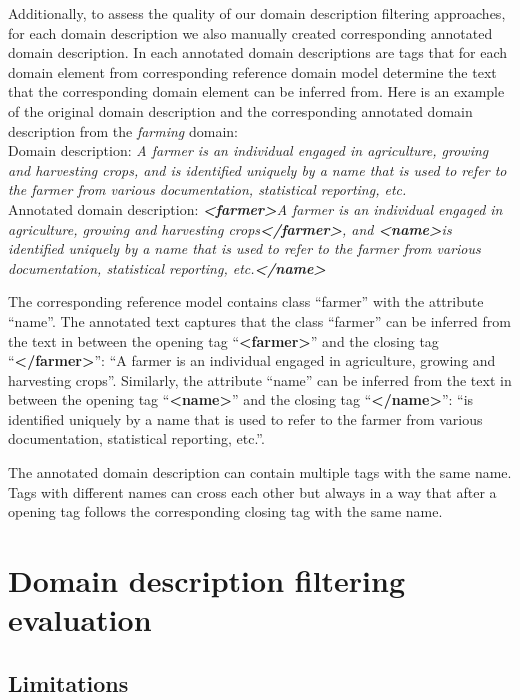 Additionally, to assess the quality of our domain description filtering approaches, for each domain description we also manually created corresponding annotated domain description. In each annotated domain descriptions are tags that for each domain element from corresponding reference domain model determine the text that the corresponding domain element can be inferred from. Here is an example of the original domain description and the corresponding annotated domain description from the \emph{farming} domain: \\

\noindent{}Domain description: \textit{A farmer is an individual engaged in agriculture, growing and harvesting crops, and is identified uniquely by a name that is used to refer to the farmer from various documentation, statistical reporting, etc.} \\

\noindent{}Annotated domain description: \textit{\textbf{<farmer>}A farmer is an individual engaged in agriculture, growing and harvesting crops\textbf{</farmer>}, and \textbf{<name>}is identified uniquely by a name that is used to refer to the farmer from various documentation, statistical reporting, etc.\textbf{</name>}}

The corresponding reference model contains class ``farmer'' with the attribute ``name''. The annotated text captures that the class ``farmer'' can be inferred from the text in between the opening tag ``\textbf{<farmer>}'' and the closing tag ``\textbf{</farmer>}'': ``A farmer is an individual engaged in agriculture, growing and harvesting crops''. Similarly, the attribute ``name'' can be inferred from the text in between the opening tag ``\textbf{<name>}'' and the closing tag ``\textbf{</name>}'': ``is identified uniquely by a name that is used to refer to the farmer from various documentation, statistical reporting, etc.''.

The annotated domain description can contain multiple tags with the same name. Tags with different names can cross each other but always in a way that after a opening tag follows the corresponding closing tag with the same name.


\section{Domain description filtering evaluation}

\subsection{Limitations}

